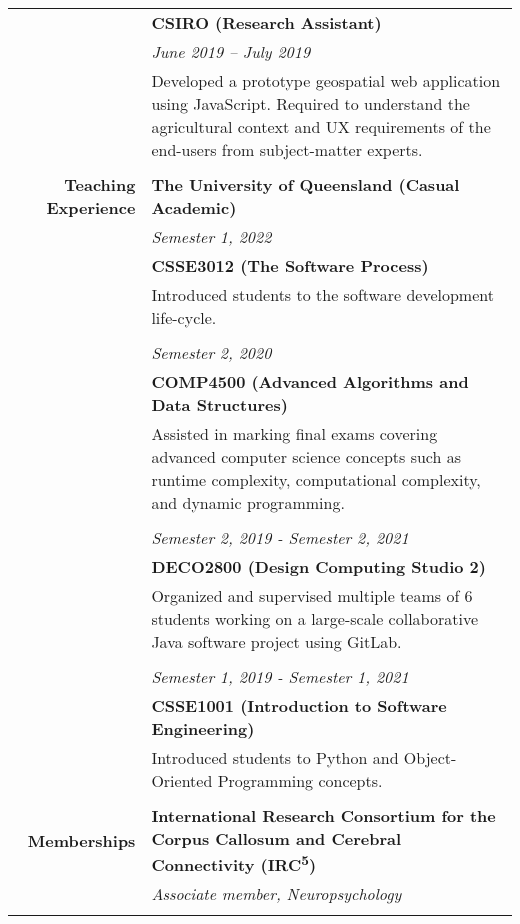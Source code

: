 \documentclass{article}
\begin{document}
\begin{longtable}{r | p{13cm}}
											& \large\textbf{CSIRO (Research Assistant)} \\
	 										& \textit{June 2019 – July 2019} \\
	 										& Developed a prototype geospatial web application using JavaScript. Required to understand the agricultural context and UX requirements of the end-users from subject-matter experts. \\
	 										& \\

		\large\textbf{Teaching Experience}	& \large\textbf{The University of Queensland (Casual Academic)} \\
											& \textit{Semester 1, 2022} \\
											& \textbf{CSSE3012 (The Software Process)} \\
											& Introduced students to the software development life-cycle. \\
											& \\
											
											& \textit{Semester 2, 2020} \\
											& \textbf{COMP4500 (Advanced Algorithms and Data Structures)} \\
											& Assisted in marking final exams covering advanced computer science concepts such as runtime complexity, computational complexity, and dynamic programming. \\
											& \\

											& \textit{Semester 2, 2019 - Semester 2, 2021} \\
											& \textbf{DECO2800 (Design Computing Studio 2)} \\
											& Organized and supervised multiple teams of 6 students working on a large-scale collaborative Java software project using GitLab. \\
											& \\
											
											& \textit{Semester 1, 2019 - Semester 1, 2021 } \\
											& \textbf{CSSE1001 (Introduction to Software Engineering)} \\
											& Introduced students to Python and Object-Oriented Programming concepts. \\
											& \\

		\large\textbf{Memberships} 	  		& \large\textbf{International Research Consortium for the Corpus Callosum and Cerebral Connectivity (IRC\textsuperscript{5})} \\
											& \textit{Associate member, Neuropsychology} \\ 
											& \\


\end{longtable}
\end{document}
